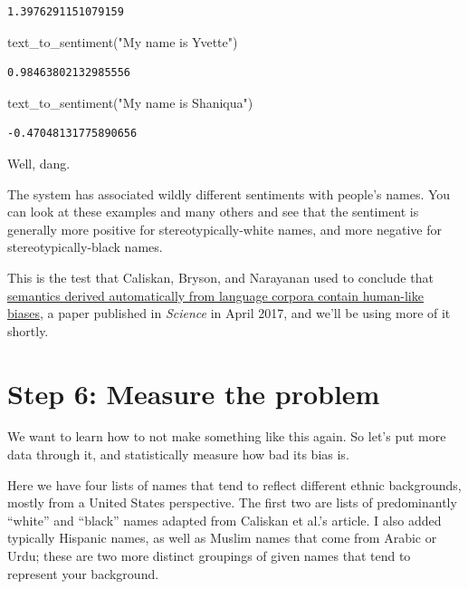 \documentclass[]{book}
\newenvironment{Shaded}{\begin{snugshade}}{\end{snugshade}}
\newcommand{\StringTok}[1]{\textcolor[rgb]{0.31,0.60,0.02}{#1}}
\newcommand{\NormalTok}[1]{#1}
\theoremstyle{definition}
\theoremstyle{definition}
\theoremstyle{definition}
\theoremstyle{remark}
\begin{document}
\begin{verbatim}
1.3976291151079159
\end{verbatim}

\begin{Shaded}
\begin{Highlighting}[]
\NormalTok{text_to_sentiment(}\StringTok{"My name is Yvette"}\NormalTok{)}
\end{Highlighting}
\end{Shaded}

\begin{verbatim}
0.98463802132985556
\end{verbatim}

\begin{Shaded}
\begin{Highlighting}[]
\NormalTok{text_to_sentiment(}\StringTok{"My name is Shaniqua"}\NormalTok{)}
\end{Highlighting}
\end{Shaded}

\begin{verbatim}
-0.47048131775890656
\end{verbatim}

Well, dang.

The system has associated wildly different sentiments with people's
names. You can look at these examples and many others and see that the
sentiment is generally more positive for stereotypically-white names,
and more negative for stereotypically-black names.

This is the test that Caliskan, Bryson, and Narayanan used to conclude
that \href{http://opus.bath.ac.uk/55288/}{semantics derived
automatically from language corpora contain human-like biases}, a paper
published in \emph{Science} in April 2017, and we'll be using more of it
shortly.

\section{Step 6: Measure the problem}\label{step-6-measure-the-problem}

We want to learn how to not make something like this again. So let's put
more data through it, and statistically measure how bad its bias is.

Here we have four lists of names that tend to reflect different ethnic
backgrounds, mostly from a United States perspective. The first two are
lists of predominantly ``white'' and ``black'' names adapted from
Caliskan et al.'s article. I also added typically Hispanic names, as
well as Muslim names that come from Arabic or Urdu; these are two more
distinct groupings of given names that tend to represent your
background.
\end{document}
